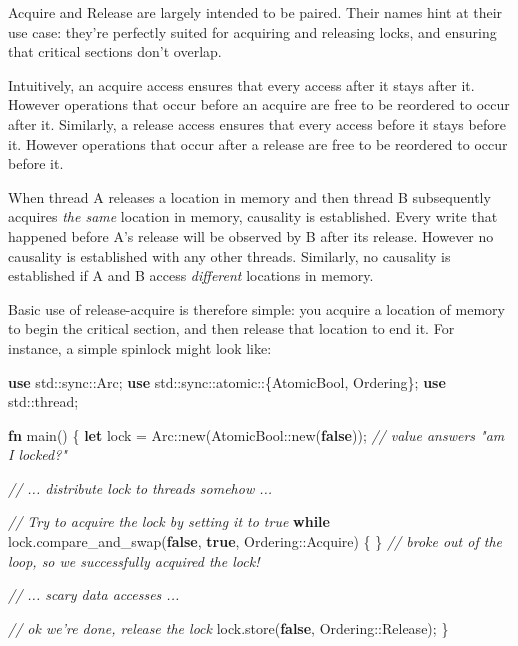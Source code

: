 \documentclass[a4paper,]{book}
\newenvironment{Shaded}{\begin{snugshade}}{\end{snugshade}}
\newcommand{\KeywordTok}[1]{\textcolor[rgb]{0.13,0.29,0.53}{\textbf{{#1}}}}
\newcommand{\CommentTok}[1]{\textcolor[rgb]{0.56,0.35,0.01}{\textit{{#1}}}}
\newcommand{\NormalTok}[1]{{#1}}
\begin{document}
Acquire and Release are largely intended to be paired. Their names hint
at their use case: they're perfectly suited for acquiring and releasing
locks, and ensuring that critical sections don't overlap.

Intuitively, an acquire access ensures that every access after it stays
after it. However operations that occur before an acquire are free to be
reordered to occur after it. Similarly, a release access ensures that
every access before it stays before it. However operations that occur
after a release are free to be reordered to occur before it.

When thread A releases a location in memory and then thread B
subsequently acquires \emph{the same} location in memory, causality is
established. Every write that happened before A's release will be
observed by B after its release. However no causality is established
with any other threads. Similarly, no causality is established if A and
B access \emph{different} locations in memory.

Basic use of release-acquire is therefore simple: you acquire a location
of memory to begin the critical section, and then release that location
to end it. For instance, a simple spinlock might look like:

\begin{Shaded}
\begin{Highlighting}[]
\KeywordTok{use} \NormalTok{std::sync::Arc;}
\KeywordTok{use} \NormalTok{std::sync::atomic::\{AtomicBool, Ordering\};}
\KeywordTok{use} \NormalTok{std::thread;}

\KeywordTok{fn} \NormalTok{main() \{}
    \KeywordTok{let} \NormalTok{lock = Arc::new(AtomicBool::new(}\KeywordTok{false}\NormalTok{)); }\CommentTok{// value answers "am I locked?"}

    \CommentTok{// ... distribute lock to threads somehow ...}

    \CommentTok{// Try to acquire the lock by setting it to true}
    \KeywordTok{while} \NormalTok{lock.compare_and_swap(}\KeywordTok{false}\NormalTok{, }\KeywordTok{true}\NormalTok{, Ordering::Acquire) \{ \}}
    \CommentTok{// broke out of the loop, so we successfully acquired the lock!}

    \CommentTok{// ... scary data accesses ...}

    \CommentTok{// ok we're done, release the lock}
    \NormalTok{lock.store(}\KeywordTok{false}\NormalTok{, Ordering::Release);}
\NormalTok{\}}
\end{Highlighting}
\end{Shaded}
\end{document}
